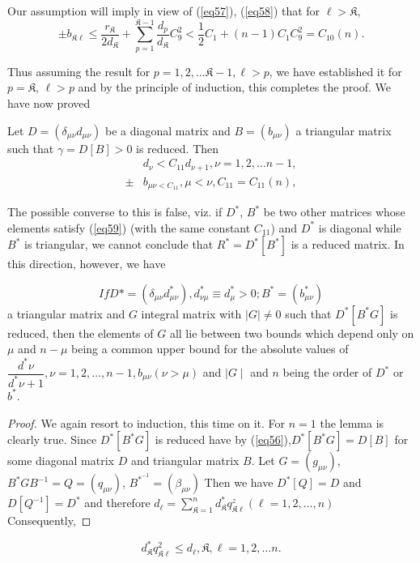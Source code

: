 Our assumption will imply in view of (\ref{eq57}), (\ref{eq58}) that for $ \ell >
\mathfrak{K}$, 
$$
\pm b_{\mathfrak{K} \ell} \leq \frac{r_\mathfrak{K}}{2 d_\mathfrak{K}}
+ \sum^{\mathfrak{K} - 1}_{p =1}  \frac{d_p}{d_\mathfrak{K}} C^2_9  <
\frac{1}{2} C_1  + ( n -1 ) C_1C^2_9 = C_{10} (n). 
$$

Thus assuming the result for $p = 1, 2, \ldots \mathfrak{K}
- 1,   \ell > p $, we have established it for $p = \mathfrak{K}$,
$\ell > p$ and by the principle of induction, this completes the
proof. We have now proved   

\begin{lem}\label{chap3:lem5}%
Let $ D = ( \delta_{\mu \nu} d_{\mu \nu}) $ be a diagonal matrix
  and $ B = ( b_{\mu \nu}) $ a triangular matrix such that $
  \gamma = D [ B ] > 0 $ is reduced. Then  
\begin{align*}
&d_\nu < C_{11} d_{ \nu + 1}, \nu = 1,2, \ldots n-1, \tag{59}\label{eq59} \\
\pm  & b_{\mu \nu < C_{11}}, \mu < \nu, C_{11} = C_{11} (n), 
\end{align*}
\end{lem}

The possible converse to this is false, viz. if $D^*$, $B^*$ be two
other matrices whose elements satisfy (\ref{eq59}) (with the same constant
$C_{11}$) and $D^*$ is diagonal while $B^*$ is triangular, we
cannot conclude that $ R^* = D^* [ B^* ] $ is a reduced matrix. In this
direction, however, we have 

\begin{lem}\label{chap3:lem6} %
$$ If 
 D* = ( \delta_{\mu \nu } d^*_{ \mu \nu } )  ,  d^*_{ \nu \mu} \equiv
 d^*_\mu > 0 ;  B^* = ( b^*_{\mu \nu} ) 
  $$
a triangular matrix and $G$ integral matrix with $ \mid G \mid  \neq 0
$  such that $ D^* [ B^* G ] $ is reduced, then the elements of $G$
all lie between two bounds which depend only on $ \mu $ and  $ n - \mu
$ being a common upper bound for the absolute values of $
\dfrac{d^*\nu}{d^*\nu +1}, \nu = 1,2, \ldots, n-1, b_{\mu \nu} (
\nu > \mu ) $ and $ \mid G \mid $ and $n$ being the order of $ D^*$
or $b^*$. 
\end{lem}

\begin{proof}
We again resort to induction, this time on it. For $n = 1$  the
lemma is clearly true. Since $ D^{*} [B^{*} G ] $ is reduced
have by  (\ref{eq56}),\pageoriginale $D^* [ B^* G ] = D [ B ] $ for
some diagonal matrix $D$ 
and triangular matrix $B$. Let $ G = ( g_{\mu \nu })$, $B^* G B^{-1} =Q
= ( q_{\mu \nu})$, $B^{*^{-1}} = ( \beta_{\mu \nu} )$ Then we have $ D^* [
  Q ] = D $ and $ D[ Q^{-1} ] = D^* $ and  therefore $ d_\ell =
\sum^n_{\mathfrak{K} = 1} d^*_\mathfrak{K} q^z_{\mathfrak{K} \ell}( \ell
= 1,2, \ldots, n)$ Consequently,  
\end{proof}
\begin{equation*}
d^*_\mathfrak{K} q^2_{\mathfrak{K} \ell} \leq d_\ell, \mathfrak{K}, \ell
= 1,2, \ldots n. \tag{60}\label{eq60}  
\end{equation*}

